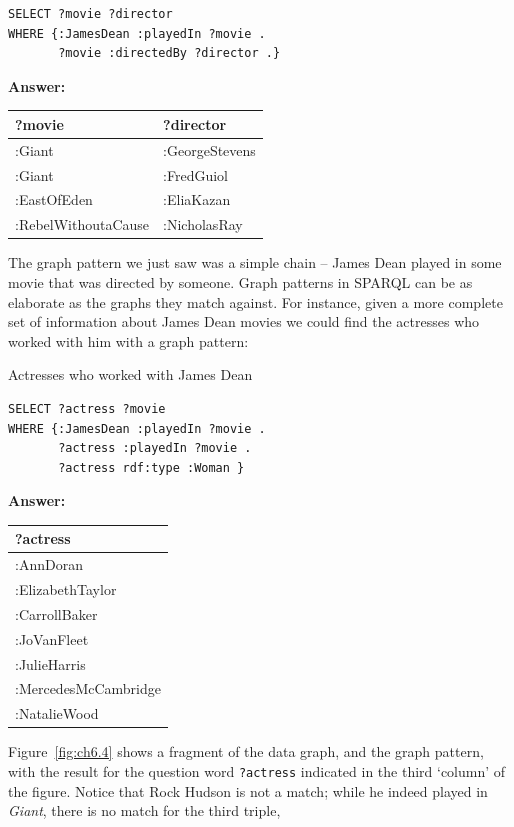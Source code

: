\begin{lstlisting}
SELECT ?movie ?director
WHERE {:JamesDean :playedIn ?movie .
       ?movie :directedBy ?director .}
\end{lstlisting}

\textbf{\textbf{Answer:}}

\begin{tabular}{|ll|}
\hline
?movie&?director\\
\hline
:Giant&:GeorgeStevens\\
:Giant&:FredGuiol\\
:EastOfEden&:EliaKazan\\
:RebelWithoutaCause&:NicholasRay\\
\hline
\end{tabular}

The graph pattern we just saw was a simple chain -- James Dean played in
some movie that was directed by someone. Graph patterns in SPARQL can be
as elaborate as the graphs they match against. For instance, given a
more complete set of information about James Dean movies we could find
the actresses who worked with him with a graph pattern:

\begin{query}Actresses who worked with James Dean\end{query}

\begin{lstlisting}
SELECT ?actress ?movie
WHERE {:JamesDean :playedIn ?movie .
       ?actress :playedIn ?movie .
       ?actress rdf:type :Woman }
\end{lstlisting}

\textbf{\textbf{Answer:}}

\begin{tabular}{|l|}
\hline
?actress\\
\hline
:AnnDoran\\
:ElizabethTaylor\\
:CarrollBaker\\
:JoVanFleet\\
:JulieHarris\\
:MercedesMcCambridge\\
:NatalieWood\\
\hline
\end{tabular}

Figure~\ref{fig:ch6.4} shows a fragment of the data graph, and the graph pattern,
with the result for the question word \texttt{?actress} indicated in the third
`column' of the figure. Notice that Rock Hudson is not a match; while he
indeed played in \emph{Giant}, there is no match for the third triple,

